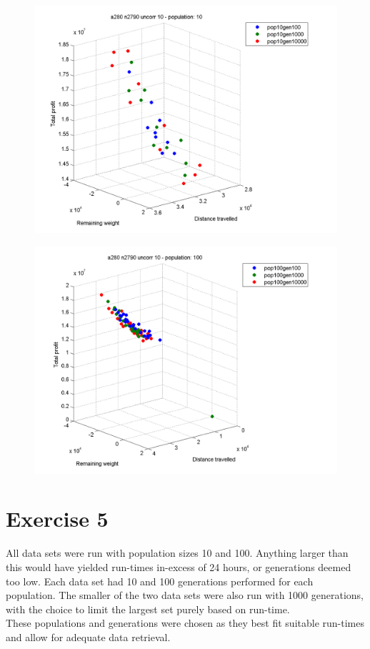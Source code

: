 \documentclass[a4paper,12pt]{article}
\begin{document}
\begin{figure}[h]
\centering
\begin{minipage}{.5\textwidth}
  \centering
  \includegraphics[width=.8\linewidth]{q4graphs/a280_n2790_pop10.png}
  \label{fig:a280279010}
\end{minipage}%
\begin{minipage}{.5\textwidth}
  \centering
  \includegraphics[width=.8\linewidth]{q4graphs/a280_n2790_pop100.png}
  \label{fig:a280279010}
\end{minipage}
\end{figure}


\section*{Exercise 5}

All data sets were run with population sizes 10 and 100. Anything larger than this would have yielded run-times in-excess of 24 hours, or generations deemed too low. Each data set had 10 and 100 generations performed for each population. The smaller of the two data sets were also run with 1000 generations, with the choice to limit the largest set purely based on run-time.\\

These populations and generations were chosen as they best fit suitable run-times and allow for adequate data retrieval.
\end{document}
